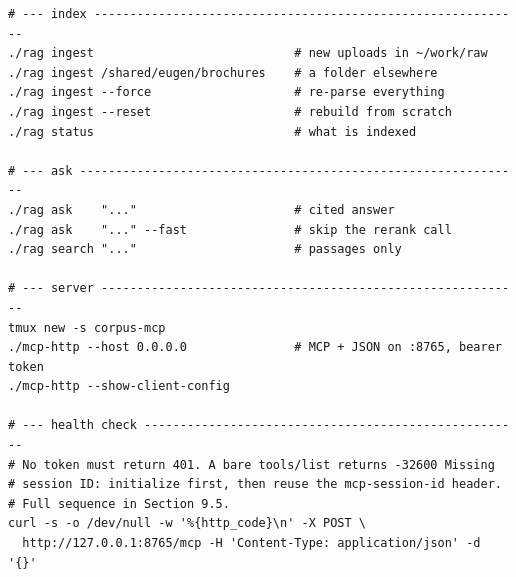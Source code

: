 \begin{lstlisting}
# --- index ------------------------------------------------------------
./rag ingest                            # new uploads in ~/work/raw
./rag ingest /shared/eugen/brochures    # a folder elsewhere
./rag ingest --force                    # re-parse everything
./rag ingest --reset                    # rebuild from scratch
./rag status                            # what is indexed

# --- ask --------------------------------------------------------------
./rag ask    "..."                      # cited answer
./rag ask    "..." --fast               # skip the rerank call
./rag search "..."                      # passages only

# --- server -----------------------------------------------------------
tmux new -s corpus-mcp
./mcp-http --host 0.0.0.0               # MCP + JSON on :8765, bearer token
./mcp-http --show-client-config

# --- health check -----------------------------------------------------
# No token must return 401. A bare tools/list returns -32600 Missing
# session ID: initialize first, then reuse the mcp-session-id header.
# Full sequence in Section 9.5.
curl -s -o /dev/null -w '%{http_code}\n' -X POST \
  http://127.0.0.1:8765/mcp -H 'Content-Type: application/json' -d '{}'
\end{lstlisting}

